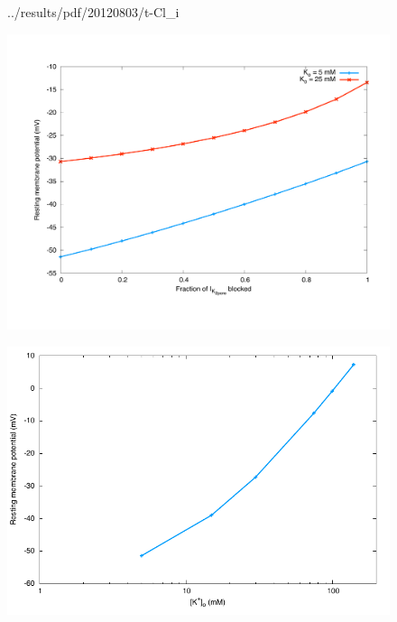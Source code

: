 \begin{figure}
{  {../results/pdf/20120803/t-Cl_i}}
  \subfloat{\hspace{0.50\textwidth}}\\
  \caption{}
  \label{fig:concentrations}
\end{figure}

\clearpage
\begin{landscape}
\begin{figure}
  \centering
  \includegraphics[width=1.0\textwidth]
    {../results/pdf/20120803/I_K_2pore_vs_RMP}
  \caption{}
  \label{fig:I_K_2pore-rmp}
\end{figure}
\end{landscape}

\clearpage
\begin{landscape}
\begin{figure}
  \centering
  \includegraphics[width=1.0\textwidth]
    {../results/pdf/20120803/K_o_vs_RMP}
  \caption{}
  \label{fig:K_o-rmp}
\end{figure}
\end{landscape}

